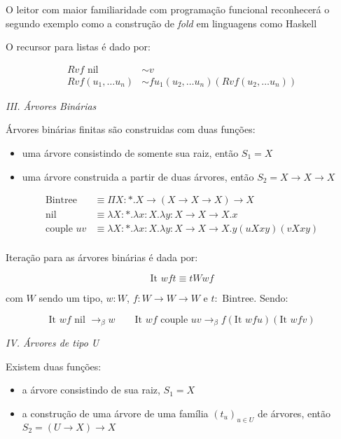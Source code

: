 \documentclass[../main.tex]{subfiles}
\begin{document}
O leitor com maior familiaridade com programação funcional reconhecerá o segundo exemplo como a construção de \emph{fold} em linguagens como Haskell

O recursor para listas é dado por:

\begin{align*}
    R v f \text{ nil } & \sim v \\
    R v f (u_1, \dots u_n) & \sim f u_1 (u_2, \dots u_n) (R v f (u_2, \dots u_n))
\end{align*}

\emph{III. Árvores Binárias}

Árvores binárias finitas são construidas com duas funções:

\begin{itemize}
    \item uma árvore consistindo de somente sua raiz, então $S_1 = X$
    \item uma árvore construida a partir de duas árvores, então $S_2 = X \to X \to X$
\end{itemize}

\begin{align*}
    \text{Bintree }    & \equiv \Pi X : \ast . X \to (X \to X \to X) \to X \\
    \text{nil }        & \equiv \lambda X : \ast . \lambda x : X . \lambda y : X \to X \to X . x \\
    \text{couple } u v & \equiv \lambda X : \ast . \lambda x : X . \lambda y : X \to X \to X . y (uXxy) (vXxy) \\
\end{align*}

Iteração para as árvores binárias é dada por:

$$\text{It } wft \equiv tWwf$$

com $W$ sendo um tipo, $w : W$, $f : W \to W \to W$ e $t : \text{ Bintree}$. Sendo:

$$\text{It } wf \text{ nil } \to_{\beta} w \qquad \text{It } wf \text{ couple } uv \to_{\beta} f (\text{It } wf u)(\text{It } wf v)$$

\emph{IV. Árvores de tipo U}

Existem duas funções:

\begin{itemize}
    \item a árvore consistindo de sua raiz, $S_1 = X$
    \item a construção de uma árvore de uma família $(t_u)_{u \in U}$ de árvores, então $S_2 = (U \to X) \to X$
\end{itemize}
\end{document}
